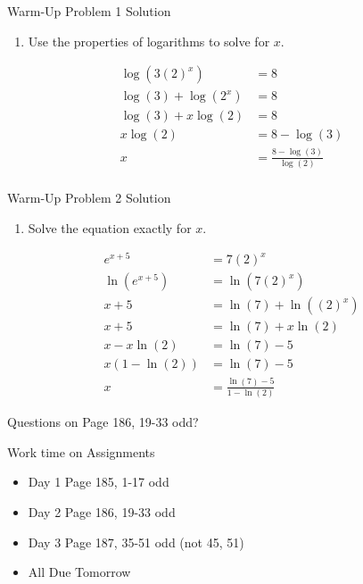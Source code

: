 \documentclass[ignorenonframetext,]{beamer}
\providecommand{\tightlist}{%
  \setlength{\itemsep}{0pt}\setlength{\parskip}{0pt}}
\begin{document}
\begin{frame}{Warm-Up Problem 1 Solution}

\begin{enumerate}
\def\labelenumi{\arabic{enumi}.}
\tightlist
\item
  Use the properties of logarithms to solve for \(x\).
\end{enumerate}

\begin{align*}
\log(3(2)^x) &= 8 \\
\log(3)+\log(2^x) &= 8 \\
\log(3)+x\log(2) &= 8 \\
x\log(2) &= 8-\log(3) \\
x &= \frac{8-\log(3)}{\log(2)} \\
\end{align*}

\end{frame}

\begin{frame}{Warm-Up Problem 2 Solution}

\begin{enumerate}
\def\labelenumi{\arabic{enumi}.}
\setcounter{enumi}{1}
\tightlist
\item
  Solve the equation exactly for \(x\).
\end{enumerate}

\begin{align*}
e^{x+5} &= 7(2)^x \\
\ln(e^{x+5}) &= \ln(7(2)^x) \\
x+5 &= \ln(7)+\ln((2)^x) \\
x+5 &= \ln(7)+x\ln(2) \\
x-x\ln(2) &= \ln(7)-5 \\
x(1-\ln(2)) &= \ln(7)-5 \\
x &= \frac{\ln(7)-5}{1-\ln(2)}
\end{align*}

\end{frame}

\begin{frame}{Questions on Page 186, 19-33 odd?}

\end{frame}

\begin{frame}{Work time on Assignments}

\begin{itemize}
\tightlist
\item
  Day 1 Page 185, 1-17 odd
\item
  Day 2 Page 186, 19-33 odd
\item
  Day 3 Page 187, 35-51 odd (not 45, 51)
\item
  All Due Tomorrow
\end{itemize}

\end{frame}
\end{document}
